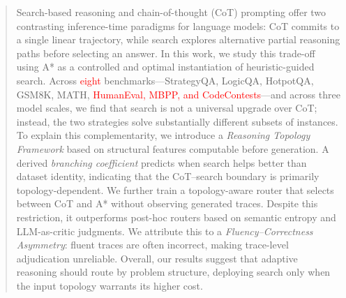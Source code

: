 \documentclass[10pt]{article}
\begin{document}



\begin{abstract}
Search-based reasoning and chain-of-thought (CoT) prompting offer two contrasting inference-time paradigms for language models: CoT commits to a single linear trajectory, while search explores alternative partial reasoning paths before selecting an answer. In this work, we study this trade-off using A* as a controlled and optimal instantiation of heuristic-guided search. Across \textcolor{red}{eight} benchmarks---StrategyQA, LogicQA, HotpotQA, GSM8K, MATH, \textcolor{red}{HumanEval, MBPP, and CodeContests}---and across three model scales, we find that search is not a universal upgrade over CoT; instead, the two strategies solve substantially different subsets of instances. To explain this complementarity, we introduce a \emph{Reasoning Topology Framework} based on structural features computable before generation. A derived \emph{branching coefficient} predicts when search helps better than dataset identity, indicating that the CoT--search boundary is primarily topology-dependent. We further train a topology-aware router that selects between CoT and A* without observing generated traces. Despite this restriction, it outperforms post-hoc routers based on semantic entropy and LLM-as-critic judgments. We attribute this to a \emph{Fluency--Correctness Asymmetry}: fluent traces are often incorrect, making trace-level adjudication unreliable. Overall, our results suggest that adaptive reasoning should route by problem structure, deploying search only when the input topology warrants its higher cost.
\end{abstract}
\end{document}
